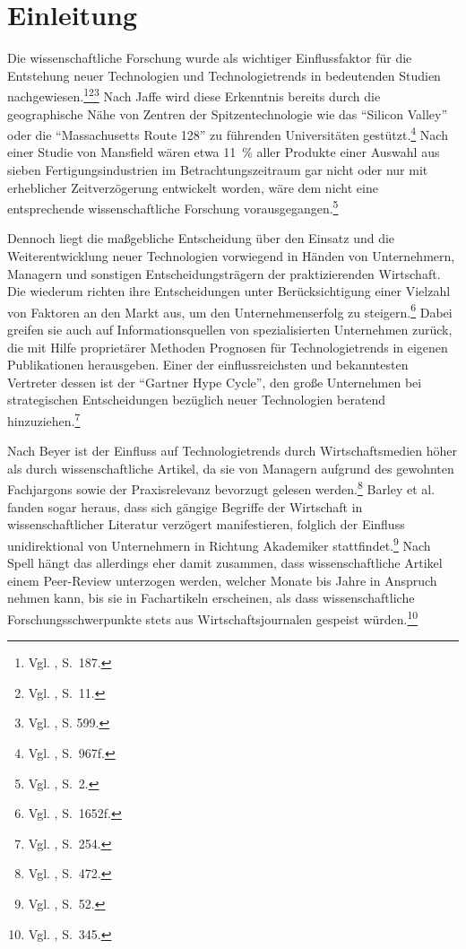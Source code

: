 \section{Einleitung}
Die wissenschaftliche Forschung wurde als wichtiger Einflussfaktor für die Entstehung neuer Technologien und Technologietrends in bedeutenden Studien nachgewiesen.\footnote{Vgl. , S.~187.}\footnote{Vgl. , S.~11.}\footnote{Vgl. , S. 599.}
Nach Jaffe wird diese Erkenntnis bereits durch die geographische Nähe von Zentren der Spitzentechnologie wie das "`Silicon Valley"' oder die "`Massachusetts Route 128"' zu führenden Universitäten gestützt.\footnote{Vgl. , S.~967f.} Nach einer Studie von Mansfield wären etwa 11~\% aller Produkte einer Auswahl aus sieben Fertigungsindustrien im Betrachtungszeitraum gar nicht oder nur mit erheblicher Zeitverzögerung entwickelt worden, wäre dem nicht eine entsprechende wissenschaftliche Forschung vorausgegangen.\footnote{Vgl. , S.~2.}

Dennoch liegt die maßgebliche Entscheidung über den Einsatz und die Weiterentwicklung neuer Technologien vorwiegend in Händen von Unternehmern, Managern und sonstigen Entscheidungsträgern der praktizierenden Wirtschaft. Die wiederum richten ihre Entscheidungen unter Berücksichtigung einer Vielzahl von Faktoren an den Markt aus, um den Unternehmenserfolg zu steigern.\footnote{Vgl. , S.~1652f.} Dabei greifen sie auch auf Informationsquellen von spezialisierten Unternehmen zurück, die mit Hilfe proprietärer Methoden Prognosen für Technologietrends in eigenen Publikationen herausgeben. Einer der einflussreichsten und bekanntesten Vertreter dessen ist der "`Gartner Hype Cycle"', den große Unternehmen bei strategischen Entscheidungen bezüglich neuer Technologien beratend hinzuziehen.\footnote{Vgl. , S.~254.}

Nach Beyer ist der Einfluss auf Technologietrends durch Wirtschaftsmedien höher als durch wissenschaftliche Artikel, da sie von Managern aufgrund des gewohnten Fachjargons sowie der Praxisrelevanz bevorzugt gelesen werden.\footnote{Vgl. , S.~472.} Barley et al. fanden sogar heraus, dass sich gängige Begriffe der Wirtschaft in wissenschaftlicher Literatur verzögert manifestieren, folglich der Einfluss unidirektional von Unternehmern in Richtung Akademiker stattfindet.\footnote{Vgl. , S.~52.} Nach Spell hängt das allerdings eher damit zusammen, dass wissenschaftliche Artikel einem Peer-Review unterzogen werden, welcher Monate bis Jahre in Anspruch nehmen kann, bis sie in Fachartikeln erscheinen, als dass wissenschaftliche Forschungsschwerpunkte stets aus Wirtschaftsjournalen gespeist würden.\footnote{Vgl. , S.~345.}

